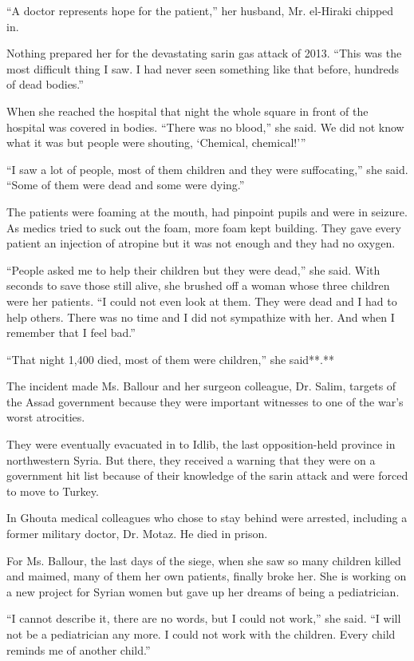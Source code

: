``A doctor represents hope for the patient,'' her husband, Mr. el-Hiraki
chipped in.

Nothing prepared her for the devastating sarin gas attack of 2013.
``This was the most difficult thing I saw. I had never seen something
like that before, hundreds of dead bodies.''

When she reached the hospital that night the whole square in front of
the hospital was covered in bodies. ``There was no blood,'' she said. We
did not know what it was but people were shouting, `Chemical,
chemical!'''

``I saw a lot of people, most of them children and they were
suffocating,'' she said. ``Some of them were dead and some were dying.''

The patients were foaming at the mouth, had pinpoint pupils and were in
seizure. As medics tried to suck out the foam, more foam kept building.
They gave every patient an injection of atropine but it was not enough
and they had no oxygen.

``People asked me to help their children but they were dead,'' she said.
With seconds to save those still alive, she brushed off a woman whose
three children were her patients. ``I could not even look at them. They
were dead and I had to help others. There was no time and I did not
sympathize with her. And when I remember that I feel bad.''

``That night 1,400 died, most of them were children,'' she said**.**

The incident made Ms. Ballour and her surgeon colleague, Dr. Salim,
targets of the Assad government because they were important witnesses to
one of the war's worst atrocities.

They were eventually evacuated in to Idlib, the last opposition-held
province in northwestern Syria. But there, they received a warning that
they were on a government hit list because of their knowledge of the
sarin attack and were forced to move to Turkey.

In Ghouta medical colleagues who chose to stay behind were arrested,
including a former military doctor, Dr. Motaz. He died in prison.

For Ms. Ballour, the last days of the siege, when she saw so many
children killed and maimed, many of them her own patients, finally broke
her. She is working on a new project for Syrian women but gave up her
dreams of being a pediatrician.

``I cannot describe it, there are no words, but I could not work,'' she
said. ``I will not be a pediatrician any more. I could not work with the
children. Every child reminds me of another child.''


